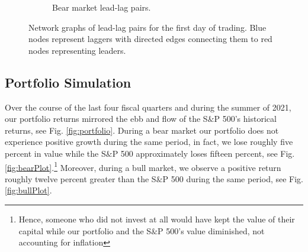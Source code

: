 \documentclass{article}
\begin{document}
\begin{figure}[H]
\begin{subfigure}{0.45\textwidth}
        \caption{Bear market lead-lag pairs.}
        \label{fig:bearNetwork}
    \end{subfigure}
    \caption{Network graphs of lead-lag pairs for the first day of trading. Blue nodes represent laggers with directed edges connecting them to red nodes representing leaders.}
    \label{fig:networks}
\end{figure}
\subsection{Portfolio Simulation}
Over the course of the last four fiscal quarters and during the summer of 2021, our portfolio returns mirrored the ebb and flow of the S$\&$P 500's historical returns, see Fig. \ref{fig:portfolio}. During a bear market our portfolio does not experience positive growth during the same period, in fact, we lose roughly five percent in value while the S$\&$P 500 approximately loses fifteen percent, see Fig. \ref{fig:bearPlot}.\footnote{Hence, someone who did not invest at all would have kept the value of their capital while our portfolio and the S$\&$P 500's value diminished, not accounting for inflation} Moreover, during a bull market, we observe a positive return roughly twelve percent greater than the S$\&$P 500 during the same period, see Fig. \ref{fig:bullPlot}.
\end{document}
